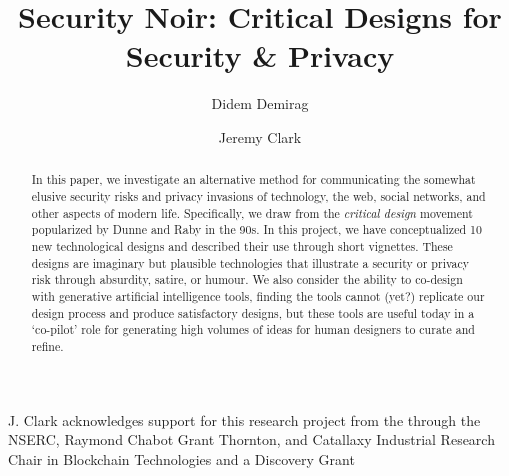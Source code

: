 \documentclass[manuscript]{acmart}
\begin{document}
\title{Security Noir: Critical Designs for Security \& Privacy}

\author{Didem Demirag}


\author{Jeremy Clark}

\begin{abstract}

In this paper, we investigate an alternative method for communicating the somewhat elusive security risks and privacy invasions of technology, the web, social networks, and other aspects of modern life. Specifically, we draw from the \textit{critical design} movement popularized by Dunne and Raby in the 90s. In this project, we have conceptualized 10 new technological designs and described their use through short vignettes. These designs are imaginary but plausible technologies that illustrate a security or privacy risk through absurdity, satire, or humour. We also consider the ability to co-design with generative artificial intelligence tools, finding the tools cannot (yet?) replicate our design process and produce satisfactory designs, but these tools are useful today in a `co-pilot' role for generating high volumes of ideas for human designers to curate and refine. 

\end{abstract}

\maketitle






\begin{anonsuppress}
\begin{acks}
%
J. Clark acknowledges support for this research project from the  through the NSERC, Raymond Chabot Grant Thornton, and Catallaxy Industrial Research Chair in Blockchain Technologies  and a Discovery Grant 
%
%
\end{acks}
\end{anonsuppress}




\end{document}
